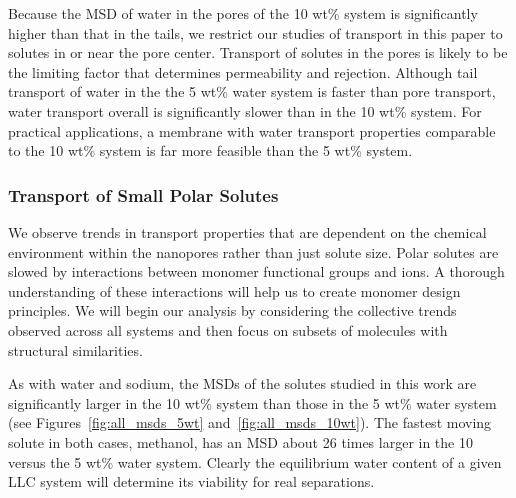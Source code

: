 \documentclass[journal=jpcbfk,manuscript=article]{achemso}
\begin{document}
  Because the MSD of water in the pores of the 10 wt\% system is significantly
  higher than that in the tails, we restrict our studies of transport in this
  paper to solutes in or near the pore center. Transport of solutes in the pores
  is likely to be the limiting factor that determines permeability and rejection.
  Although tail transport of water in the the 5 wt\% water system is faster than
  pore transport, water transport overall is significantly slower than in the 10
  wt\% system. For practical applications, a membrane with water transport
  properties comparable to the 10 wt\% system is far more feasible than the 5
  wt\% system.
 
%  
%
%
%

 \subsubsection{Transport of Small Polar Solutes}\label{section:general_transport_solutes}  
  
  We observe trends in transport properties that are dependent on the chemical 
  environment within the nanopores rather than just solute size. Polar solutes
  are slowed by interactions between monomer functional groups and ions. 
  A thorough understanding of these interactions will help us to create monomer
  design principles. We will begin our analysis by considering the collective
  trends observed across all systems and then focus on subsets of molecules
  with structural similarities.

  As with water and sodium, the MSDs of the solutes studied in this work are 
  significantly larger in the 10 wt\% system than those in the 5 wt\% water 
  system (see Figures~\ref{fig:all_msds_5wt} and~\ref{fig:all_msds_10wt}). The fastest moving solute in both cases, 
  methanol, has an MSD about 26 times larger in the 10 versus the 5 wt\%
  water system. Clearly the equilibrium water content of a given LLC system will 
  determine its viability for real separations.
  
\end{document}
